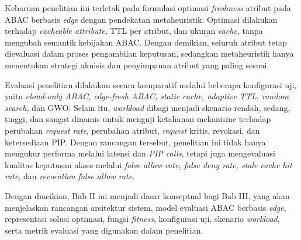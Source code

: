 Kebaruan penelitian ini terletak pada formulasi optimasi \textit{freshness} atribut pada ABAC berbasis \textit{edge} dengan pendekatan metaheuristik. Optimasi dilakukan terhadap \textit{cacheable attribute}, TTL per atribut, dan ukuran \textit{cache}, tanpa mengubah semantik kebijakan ABAC. Dengan demikian, seluruh atribut tetap dievaluasi dalam proses pengambilan keputusan, sedangkan metaheuristik hanya menentukan strategi akuisis dan penyimpanan atribut yang paling sesuai.

Evaluasi penelitian dilakukan secara komparatif melalui beberapa konfigurasi uji, yaitu \textit{cloud-only ABAC, edge-fresh ABAC, static cache, adaptive TTL, random search,} dan GWO. Selain itu, \textit{workload} dibagi menjadi skenario rendah, sedang, tinggi, dan sangat dinamis untuk menguji ketahanan mekanisme terhadap perubahan \textit{request rate}, perubahan atribut, \textit{request} kritis, revokasi, dan ketersediaan PIP. Dengan rancangan tersebut, penelitian ini tidak hanya mengukur performa melalui latensi dan \textit{PIP calls}, tetapi juga mengevaluasi kualitas keputusan akses melalui \textit{false allow rate, false deny rate, stale cache hit rate}, dan \textit{revocation false allow rate}.

Dengan dmeikian, Bab II ini menjadi dasar konseptual bagi Bab III, yang akan menjelaskan rancangan arsitektur sistem, model evaluasi ABAC berbasis \textit{edge}, representasi solusi optimasi, fungsi \textit{fitness}, konfigurasi uji, skenario \textit{workload}, serta metrik evaluasi yang digunakan dalam penelitian.

